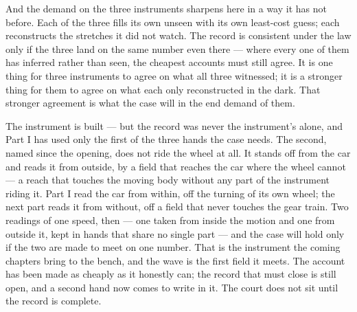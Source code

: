 And the demand on the three instruments sharpens here in a way it has not before. Each of the three fills its
own unseen with its own least-cost guess; each reconstructs the stretches it did not watch. The record is
consistent under the law only if the three land on the same number even there --- where every one of them has
inferred rather than seen, the cheapest accounts must still agree. It is one thing for three instruments to
agree on what all three witnessed; it is a stronger thing for them to agree on what each only reconstructed in
the dark. That stronger agreement is what the case will in the end demand of them.

The instrument is built --- but the record was never the instrument's alone, and Part I has used only the first
of the three hands the case needs. The second, named since the opening, does not ride the wheel at all. It
stands off from the car and reads it from outside, by a field that reaches the car where the wheel cannot ---
a reach that touches the moving body without any part of the instrument riding it. Part I read the car from
within, off the turning of its own wheel; the next part reads it from without, off a field that never touches
the gear train. Two readings of one speed,
then --- one taken from inside the motion and one from outside it, kept in hands that share no single part ---
and the case will hold only if the two are made to meet on one number. That is the instrument the coming
chapters bring to the bench, and the wave is the first field it meets. The account has been made as
cheaply as it honestly can; the record that must close is still open, and a second hand now comes to write in
it. The court does not sit until the record is complete.

